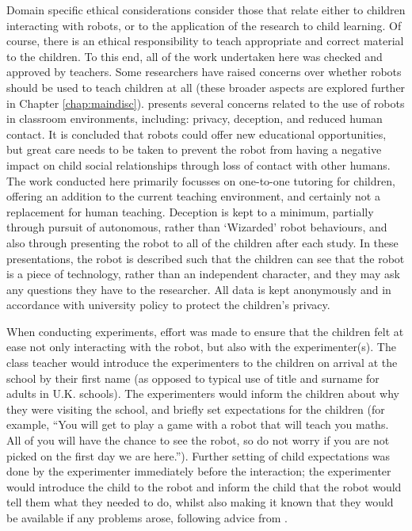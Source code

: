 Domain specific ethical considerations consider those that relate either to children interacting with robots, or to the application of the research to child learning. Of course, there is an ethical responsibility to teach appropriate and correct material to the children. To this end, all of the work undertaken here was checked and approved by teachers. Some researchers have raised concerns over whether robots should be used to teach children at all (these broader aspects are explored further in Chapter \ref{chap:maindisc}). \cite{sharkey2016robot} presents several concerns related to the use of robots in classroom environments, including: privacy, deception, and reduced human contact. It is concluded that robots could offer new educational opportunities, but great care needs to be taken to prevent the robot from having a negative impact on child social relationships through loss of contact with other humans. The work conducted here primarily focusses on one-to-one tutoring for children, offering an addition to the current teaching environment, and certainly not a replacement for human teaching. Deception is kept to a minimum, partially through pursuit of autonomous, rather than `Wizarded' robot behaviours, and also through presenting the robot to all of the children after each study. In these presentations, the robot is described such that the children can see that the robot is a piece of technology, rather than an independent character, and they may ask any questions they have to the researcher. All data is kept anonymously and in accordance with university policy to protect the children's privacy.

When conducting experiments, effort was made to ensure that the children felt at ease not only interacting with the robot, but also with the experimenter(s). The class teacher would introduce the experimenters to the children on arrival at the school by their first name (as opposed to typical use of title and surname for adults in U.K. schools). The experimenters would inform the children about why they were visiting the school, and briefly set expectations for the children (for example, ``You will get to play a game with a robot that will teach you maths. All of you will have the chance to see the robot, so do not worry if you are not picked on the first day we are here.''). Further setting of child expectations was done by the experimenter immediately before the interaction; the experimenter would introduce the child to the robot and inform the child that the robot would tell them what they needed to do, whilst also making it known that they would be available if any problems arose, following advice from \citet{ros2011child}.


